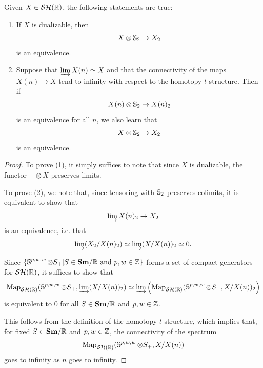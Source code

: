 \begin{prop} \label{prop:compl-facts}
  Given $X \in \mathcal{SH}(\mathbb{R})$, the following statements are true:
  \begin{enumerate}
    \item If $X$ is dualizable, then
  \[X \otimes \operatorname{\mathbb{S}}_2 \to X_2\]
  is an equivalence.

%
\item Suppose that $\varinjlim X(n) \simeq X$ and that the connectivity of the maps $X(n) \to X$ tend to infinity with respect to the homotopy $t$-structure. Then if
  \[X(n) \otimes \operatorname{\mathbb{S}}_2 \to X(n)_2\]
  is an equivalence for all $n$, we also learn that
  \[X \otimes \operatorname{\mathbb{S}}_2 \to X_2\]
  is an equivalence.
  \end{enumerate}
\end{prop}

\begin{proof}
  To prove (1), it simply suffices to note that since $X$ is dualizable, the functor $- \otimes X$ preserves limits.

%
  To prove (2), we note that, since tensoring with $\operatorname{\mathbb{S}}_2$ preserves colimits, it is equivalent to show that
  \[\varinjlim X(n)_2 \to X_2\]
  is an equivalence, i.e. that
  \[\varinjlim (X_2 / X(n)_2) \simeq \varinjlim (X/X(n))_2 \simeq 0 .\]

  Since $\{\operatorname{\mathbb{S}}^{p,w,w} \otimes S_+ \vert S \in \textbf{Sm}/\mathbb{R} \text{ and } p,w \in \mathbb{Z}\}$ forms a set of compact generators for $\mathcal{SH}(\mathbb{R})$, it suffices to show that
  \[\operatorname{\mathrm{Map}}_{\mathcal{SH}(\mathbb{R})} (\operatorname{\mathbb{S}}^{p,w,w} \otimes S_+, \varinjlim(X/X(n))_2 ) \simeq \varinjlim \left( \operatorname{\mathrm{Map}}_{\mathcal{SH}(\mathbb{R})} (\operatorname{\mathbb{S}}^{p,w,w} \otimes S_+, X/X(n))_2 \right)\]
  is equivalent to $0$ for all $S \in \textbf{Sm}/\mathbb{R}$ and $p,w \in \mathbb{Z}$.

  This follows from the definition of the homotopy $t$-structure, which implies that, for fixed $S \in \textbf{Sm}/\mathbb{R}$ and $p,w \in \mathbb{Z}$, the connectivity of the spectrum
  \[\operatorname{\mathrm{Map}}_{\mathcal{SH}(\mathbb{R})} (\operatorname{\mathbb{S}}^{p,w,w} \otimes S_+, X/X(n))\]
  goes to infinity as $n$ goes to infinity.
%
\end{proof}

